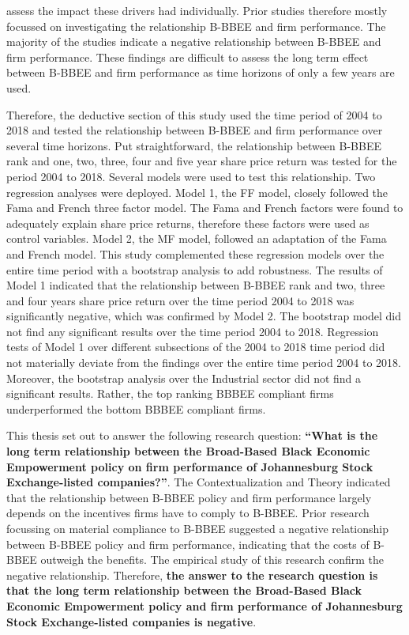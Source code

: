 assess the impact these drivers had individually. Prior studies therefore mostly focussed on investigating the relationship B-BBEE and firm performance. The majority of the studies indicate a negative relationship between B-BBEE and firm performance. These findings are difficult to assess the long term effect between B-BBEE and firm performance as time horizons of only a few years are used.

Therefore, the deductive section of this study used the time period of 2004 to 2018 and tested the relationship between B-BBEE and firm performance over several time horizons. Put straightforward, the relationship between B-BBEE rank and one, two, three, four and five year share price return was tested for the period 2004 to 2018. Several models were used to test this relationship. Two regression analyses were deployed. Model 1, the FF model, closely followed the Fama and French three factor model. The Fama and French factors were found to adequately explain share price returns, therefore these factors were used as control variables. Model 2, the MF model, followed an adaptation of the Fama and French model. This study complemented these regression models over the entire time period with a bootstrap analysis to add robustness. The results of Model 1 indicated that the relationship between B-BBEE rank and two, three and four years share price return over the time period 2004 to 2018 was significantly negative, which was confirmed by Model 2. The bootstrap model did not find any significant results over the time period 2004 to 2018. Regression tests of Model 1 over different subsections of the 2004 to 2018 time period did not materially deviate from the findings over the entire time period 2004 to 2018. Moreover, the bootstrap analysis over the Industrial sector did not find a significant results. Rather, the top ranking BBBEE compliant firms underperformed the bottom BBBEE compliant firms.

This thesis set out to answer the following research question: \textbf{“What is the long term relationship between the Broad-Based Black Economic Empowerment policy on firm performance of Johannesburg Stock Exchange-listed companies?”}.  The Contextualization and Theory indicated that the relationship between B-BBEE policy and firm performance largely depends on the incentives firms have to comply to B-BBEE. Prior research focussing on material compliance to B-BBEE suggested a negative relationship between B-BBEE policy and firm performance, indicating that the costs of B-BBEE outweigh the benefits. The empirical study of this research confirm the negative relationship. Therefore, \textbf{the answer to the research question is that the long term relationship between the Broad-Based Black Economic Empowerment policy and firm performance of Johannesburg Stock Exchange-listed companies is negative}.

